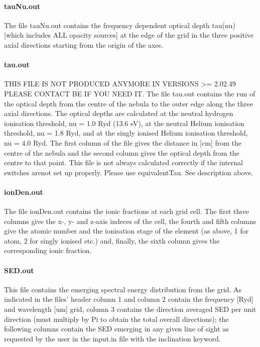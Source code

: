 \documentclass[11pt]{article}
\begin{document}
\paragraph{    tauNu.out}
The file tauNu.out contains the frequency dependent optical depth tau(nu) [which includes ALL opacity sources] at the edge of the grid in the three positive axial directions starting from the origin of the axes. 
\\

\paragraph{    tau.out}
    THIS FILE IS NOT PRODUCED ANYMORE IN VERSIONS >= 2.02.49 PLEASE CONTACT BE IF YOU NEED IT. 
    The file tau.out contains the run of the optical depth from the centre of the 
    nebula to the outer edge along the three axial directions. The optical depths 
    are calculated at the neutral hydrogen ionisation threshold, nu = 1.0 Ryd 
    (13.6 eV), at the neutral Helium ionisation threshold, nu = 1.8 Ryd, and at 
    the singly ionised Helium ionisation threshold, nu = 4.0 Ryd. The first column 
    of the file gives the distance in [cm] from the centre of the nebula and the 
    second column gives the optical depth from the centre to that point. This file
    is not always calculated correctly if the internal switches arenot set up properly. 
    Please use equivalentTau. See description above.\\    

\paragraph{    ionDen.out}
    The file ionDen.out contains the ionic fractions at each grid cell. The first 
    three columns give the x-, y- and z-axis indeces of the cell, the fourth and 
    fifth columns give the atomic number and the ionisation stage of the element 
    (as above, 1 for atom, 2 for singly ionised etc.) and, finally, the sixth 
    column gives the corresponding ionic fraction.\\

\paragraph{    SED.out}
    This file contains the emerging spectral energy distribution from the grid. 
    As indicated in the files' header column 1 and column 2 contain the frequency 
    [Ryd] and wavelength [um] grid, column 3 contains the direction averaged 
    SED per unit direction (must multiply by Pi to obtain the total overall 
    directions); the following columns contain the SED emerging in any given 
    line of sight as requested by the user in the input.in file with the 
    inclination keyword.\\
\end{document}
